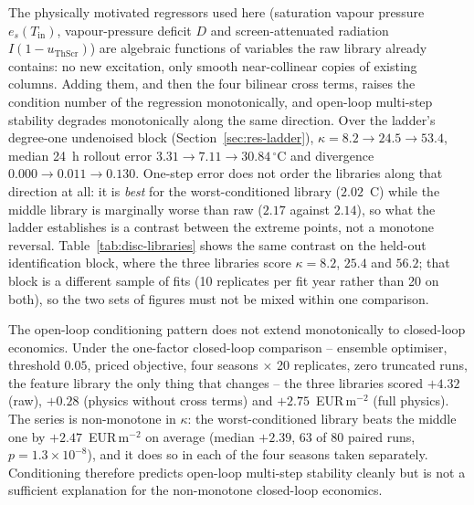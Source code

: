 The physically motivated regressors used here (saturation vapour pressure $e_s(T_{\text{in}})$, vapour-pressure deficit $D$ and screen-attenuated radiation $I(1-u_{\text{ThScr}})$) are algebraic functions of variables the raw
library already contains: no new excitation, only smooth near-collinear copies
of existing columns. Adding them, and then the four bilinear cross terms, raises
the condition number of the regression monotonically, and open-loop multi-step
stability degrades monotonically along the same direction. Over the ladder's
degree-one undenoised block (Section~\ref{sec:res-ladder}),
$\kappa = 8.2 \rightarrow 24.5 \rightarrow 53.4$, median 24~h rollout error
$3.31 \rightarrow 7.11 \rightarrow 30.84\,^\circ$C and divergence
$0.000 \rightarrow 0.011 \rightarrow 0.130$. One-step error does not order the
libraries along that direction at all: it is \emph{best} for the worst-conditioned
library ($2.02$~\textdegree C) while the middle library is marginally worse than
raw ($2.17$ against $2.14$), so what the ladder establishes is a contrast between
the extreme points, not a monotone reversal.
Table~\ref{tab:disc-libraries} shows the same contrast on the held-out
identification block, where the three libraries score $\kappa = 8.2$, $25.4$ and
$56.2$; that block is a different sample of fits (10 replicates per fit year
rather than 20 on both), so the two sets of figures must not be mixed within one
comparison.

The open-loop conditioning pattern does not extend monotonically to closed-loop
economics. Under the one-factor closed-loop comparison -- ensemble optimiser,
threshold $0.05$, priced objective, four seasons
$\times$ 20 replicates, zero truncated runs, the feature library the only thing
that changes -- the three libraries scored $+4.32$ (raw), $+0.28$ (physics without
cross terms) and $+2.75$~EUR\,m$^{-2}$ (full physics). The series is
non-monotone in $\kappa$: the worst-conditioned library beats the middle
one by $+2.47$~EUR\,m$^{-2}$ on average (median $+2.39$, 63 of 80 paired runs,
$p=1.3\times10^{-8}$), and it does so in each of the four seasons taken
separately.
Conditioning therefore predicts open-loop multi-step stability cleanly but is not a
sufficient explanation for the non-monotone closed-loop economics.

